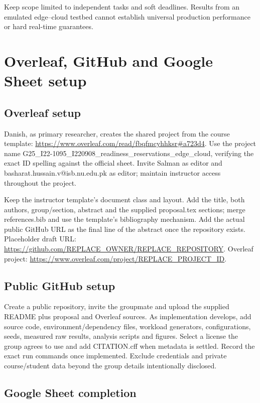\documentclass[11pt,a4paper]{article}
\begin{document}
Keep scope limited to independent tasks and soft deadlines. Results from an emulated edge--cloud testbed cannot establish universal production performance or hard real-time guarantees.

\section{Overleaf, GitHub and Google Sheet setup}

\subsection{Overleaf setup}

Danish, as primary researcher, creates the shared project from the course template: \url{https://www.overleaf.com/read/fbqfmcyhhksr#a723d4}. Use the project name G25\_I22-1095\_I220908\_readiness\_reservations\_edge\_cloud, verifying the exact ID spelling against the official sheet. Invite Salman as editor and basharat.hussain.v@isb.nu.edu.pk as editor; maintain instructor access throughout the project.

Keep the instructor template's document class and layout. Add the title, both authors, group/section, abstract and the supplied proposal.tex sections; merge references.bib and use the template's bibliography mechanism. Add the actual public GitHub URL as the final line of the abstract once the repository exists. Placeholder draft URL: \url{https://github.com/REPLACE_OWNER/REPLACE_REPOSITORY}. Overleaf project: \url{https://www.overleaf.com/project/REPLACE_PROJECT_ID}.

\subsection{Public GitHub setup}

Create a public repository, invite the groupmate and upload the supplied README plus proposal and Overleaf sources. As implementation develops, add source code, environment/dependency files, workload generators, configurations, seeds, measured raw results, analysis scripts and figures. Select a license the group agrees to use and add CITATION.cff when metadata is settled. Record the exact run commands once implemented. Exclude credentials and private course/student data beyond the group details intentionally disclosed.

\subsection{Google Sheet completion}
\end{document}
